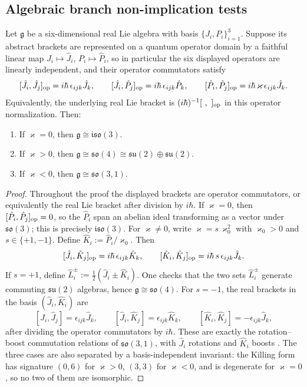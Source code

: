 \documentclass[11pt,a4paper]{article}
\begin{document}
\subsection{Algebraic branch non-implication tests}
\label{p2b:app:algebraic-branch-diagnostics}
\begin{theorem}
\label{p2:thm:compact_selection}
Let $\mathfrak{g}$ be a six-dimensional real Lie algebra with basis
$\{J_i,P_i\}_{i=1}^3$.  Suppose its abstract brackets are represented on a
quantum operator domain by a faithful linear map
$J_i\mapsto\hat J_i$, $P_i\mapsto\hat P_i$, so in particular the six
displayed operators are linearly independent, and their operator commutators
satisfy
\[
[\hat J_i,\hat J_j]_{\rm op}= i\hbar\,\epsilon_{ijk}\hat J_k,\qquad
[\hat J_i,\hat P_j]_{\rm op}= i\hbar\,\epsilon_{ijk}\hat P_k,\qquad
[\hat P_i,\hat P_j]_{\rm op}= i\hbar\,\varkappa\,\epsilon_{ijk}\hat J_k.
\]
Equivalently, the underlying real Lie bracket is $(i\hbar)^{-1}[\ ,\ ]_{\rm op}$ in this operator normalization. Then:
\begin{enumerate}
\item If $\varkappa=0$, then $\mathfrak{g}\cong\mathfrak{iso}(3)$.
\item If $\varkappa>0$, then $\mathfrak{g}\cong\mathfrak{so}(4)\cong \mathfrak{su}(2)\oplus\mathfrak{su}(2)$.
\item If $\varkappa<0$, then $\mathfrak{g}\cong\mathfrak{so}(3,1)$.
\end{enumerate}
\end{theorem}

\begin{proof}
Throughout the proof the displayed brackets are operator commutators, or equivalently the real Lie bracket after division by $i\hbar$.  If $\varkappa=0$, then $[\hat P_i,\hat P_j]_{\rm op}=0$, so the $\hat P_i$ span an abelian ideal transforming as a vector under $\mathfrak{so}(3)$; this is precisely $\mathfrak{iso}(3)$.
For $\varkappa\neq 0$, write $\varkappa=s\,\varkappa_0^2$ with $\varkappa_0>0$ and $s\in\{+1,-1\}$. Define $\hat K_i:=\hat P_i/\varkappa_0$. Then
\[
[\hat J_i,\hat K_j]_{\rm op}=i\hbar\,\epsilon_{ijk}\hat K_k,\qquad
[\hat K_i,\hat K_j]_{\rm op}= i\hbar\,s\,\epsilon_{ijk}\hat J_k.
\]
If $s=+1$, define $\hat L_i^\pm:=\frac12(\hat J_i\pm \hat K_i)$. One checks that the two sets $\hat L_i^\pm$ generate commuting $\mathfrak{su}(2)$ algebras, hence $\mathfrak{g}\cong\mathfrak{so}(4)$. For $s=-1$, the real brackets in the basis $(\hat J_i,\hat K_i)$ are
\[
[\hat J_i,\hat J_j]=\epsilon_{ijk}\hat J_k,\qquad
[\hat J_i,\hat K_j]=\epsilon_{ijk}\hat K_k,\qquad
[\hat K_i,\hat K_j]=-\epsilon_{ijk}\hat J_k,
\]
after dividing the operator commutators by $i\hbar$.  These are exactly the rotation--boost commutation relations of $\mathfrak{so}(3,1)$, with $\hat J_i$ rotations and $\hat K_i$ boosts \cite{Hall2015lie}.  The three cases are also separated by a basis-independent invariant: the Killing form has signature $(0,6)$ for $\varkappa>0$, $(3,3)$ for $\varkappa<0$, and is degenerate for $\varkappa=0$, so no two of them are isomorphic.
\end{proof}
\end{document}
